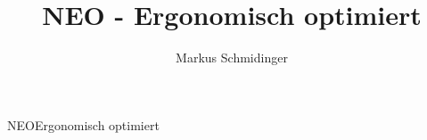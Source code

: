 \documentclass{beamer}
\title{NEO - Ergonomisch optimiert}
\author[M. Schmidinger]{
    Markus Schmidinger
}
\begin{document}
\frame{
  \titlepage
}

\begin{frame}[fragile]{NEO}{Ergonomisch optimiert}
\end{frame}

\end{document}
